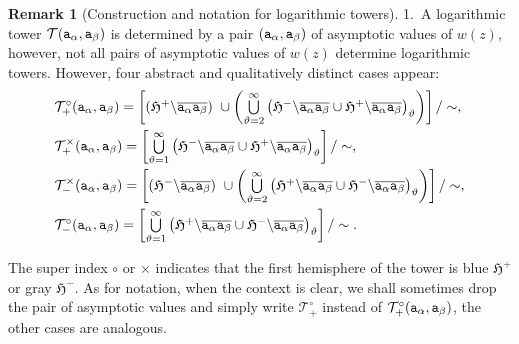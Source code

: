 \documentclass[final,3p,times]{elsarticle}
\theoremstyle{definition}
\newtheorem{remark}[theorem]{Remark}
\begin{document}
\begin{remark}[Construction and notation for logarithmic towers]
1.\ 
A logarithmic tower $\mathcal{T}({\tt a}_{\alpha}, {\tt a}_{\beta})$ is determined by
a pair $({\tt a}_{\alpha}, {\tt a}_{\beta})$ 
of asymptotic values of $w(z)$,
however, not all pairs of asymptotic values of $w(z)$ determine logarithmic towers.
However,
four abstract and qualitatively distinct cases appear:
\begin{equation}
\label{fig:4-torres}
\begin{array}{l}
\mathcal{T}^{\circ}_{+} ( {\tt a}_{\alpha}, {\tt a}_{\beta} )=
\left[ 
(\mathfrak{H}^+ \backslash  \overline{{\tt a}_{\alpha} {\tt a}_{\beta}} )
\ \cup \left(
\bigcup\limits_{\vartheta=2}^{\infty} \big( 
\mathfrak{H}^- \backslash  \overline{{\tt a}_{\alpha} {\tt a}_{\beta}} 
\cup
\mathfrak{H}^+ \backslash  \overline{{\tt a}_{\alpha} {\tt a}_{\beta}} 
\big)_{\vartheta} 
\right)
\right] / \sim ,
\\[10pt]
\mathcal{T}^\times_{+} ( {\tt a}_{\alpha}, {\tt a}_{\beta} )= 
\left[
\bigcup\limits_{\vartheta=1}^{\infty} \big( 
\mathfrak{H}^- \backslash  \overline{{\tt a}_{\alpha} {\tt a}_{\beta}} 
\cup
\mathfrak{H}^+ \backslash  \overline{{\tt a}_{\alpha} {\tt a}_{\beta}} 
\big)_{\vartheta} 
\right] / \sim ,
\\[10pt]
\mathcal{T}^\times_{-} ( {\tt a}_{\alpha}, {\tt a}_{\beta} )= 
\left[ 
(\mathfrak{H}^- \backslash  \overline{{\tt a}_{\alpha} {\tt a}_{\beta}} )
\ \cup \left(
\bigcup\limits_{\vartheta=2}^{\infty} \big( 
\mathfrak{H}^+ \backslash  \overline{{\tt a}_{\alpha} {\tt a}_{\beta}} 
\cup
\mathfrak{H}^- \backslash  \overline{{\tt a}_{\alpha} {\tt a}_{\beta}} 
\big)_{\vartheta} 
\right)
\right] / \sim ,
\\[10pt]
\mathcal{T}^\circ_{-} ( {\tt a}_{\alpha}, {\tt a}_{\beta} )= 
\left[
\bigcup\limits_{\vartheta=1}^{\infty} \big( 
\mathfrak{H}^+ \backslash  \overline{{\tt a}_{\alpha} {\tt a}_{\beta}} 
\cup
\mathfrak{H}^- \backslash  \overline{{\tt a}_{\alpha} {\tt a}_{\beta}} 
\big)_{\vartheta} 
\right]/ \sim .
\end{array}
\end{equation}

\noindent 
The super index $\circ$ or $\times$ indicates that the
first hemisphere of the tower is  blue $\mathfrak{H}^+$ or gray 
$\mathfrak{H}^-$.
As for notation, when the context is clear, we shall sometimes drop the pair of asymptotic values and 
simply write 
$\mathcal{T}^{\circ}_{+}$ instead of 
$\mathcal{T}^{\circ}_{+} ( {\tt a}_{\alpha}, {\tt a}_{\beta} )$, the other cases are analogous.


\end{remark}
\end{document}
